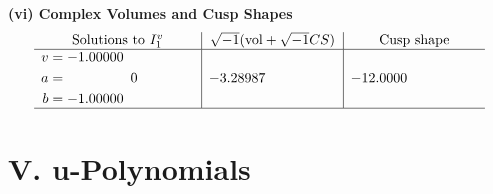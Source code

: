 \documentclass[1p]{elsarticle_modified}
\theoremstyle{definition}
\newcommand{\I}{\sqrt{-1}}
\begin{document}
\newpage\flushleft \textbf{(vi) Complex Volumes and Cusp Shapes}
$$\begin{array}{c|c|c}  
\text{Solutions to }I^v_{1}& \I (\text{vol} + \sqrt{-1}CS) & \text{Cusp shape}\\
 \hline 
\begin{aligned}
v &= -1.00000\phantom{ +0.000000I} \\
a &= \phantom{-0.000000 } 0 \\
b &= -1.00000\phantom{ +0.000000I}\end{aligned}
 & -3.28987\phantom{ +0.000000I} & -12.0000\phantom{ +0.000000I}\\
 \hline 
 \end{array}$$\newpage
\newpage\renewcommand{\arraystretch}{1}
\centering \section*{ V. u-Polynomials}
\end{document}
